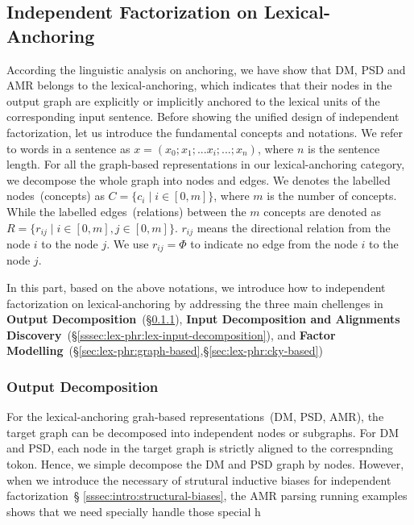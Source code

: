\subsection{Independent Factorization on Lexical-Anchoring}
\label{ssec:lex-phr:lex-factorization-analysis}

According the linguistic analysis on anchoring, we have show that DM,
PSD and AMR belongs to the lexical-anchoring, which indicates that
their nodes in the output graph are explicitly or implicitly anchored
to the lexical units of the corresponding input sentence.  Before
showing the unified design of independent factorization, let us
introduce the fundamental concepts and notations. We refer to words in
a sentence as $x=(x_{0};x_{1};...x_{i};...;x_{n})$, where $n$ is the
sentence length.  For all the graph-based representations in our
lexical-anchoring category, we decompose the whole graph into nodes
and edges. We denotes the labelled nodes~(concepts) as
$C = \{c_{i}\mid i \in [0,m]\}$, where $m$ is the number of concepts.
While the labelled edges~(relations) between the $m$ concepts are
denoted as $R = \{r_{ij}\mid i \in [0, m], j \in [0, m]\}$.  $r_{ij}$ means
the directional relation from the node $i$ to the node $j$.  We use
$r_{ij}=\Phi$ to indicate no edge from the node $i$ to the node $j$.

In this part, based on the above notations, we introduce how to
independent factorization on lexical-anchoring by addressing the three
main chellenges in \textbf{Output
  Decomposition}~(\S\ref{sssec:lex-phr:lex-output-decomposition}),
\textbf{Input Decomposition and Alignments
  Discovery}~(\S\ref{sssec:lex-phr:lex-input-decomposition}), and
\textbf{Factor
  Modelling}~(\S\ref{sec:lex-phr:graph-based},\S\ref{sec:lex-phr:cky-based})
\subsubsection{Output Decomposition}
\label{sssec:lex-phr:lex-output-decomposition}
For the lexical-anchoring grah-based representations~(DM, PSD, AMR),
the target graph can be decomposed into independent nodes or
subgraphs. For DM and PSD, each node in the target graph is strictly
aligned to the correspnding tokon. Hence, we simple decompose the DM
and PSD graph by nodes. However, when we introduce the necessary of
strutural inductive biases for independent factorization~\S
\ref{sssec:intro:structural-biases}, the AMR parsing running examples
shows that we need specially handle those special h



